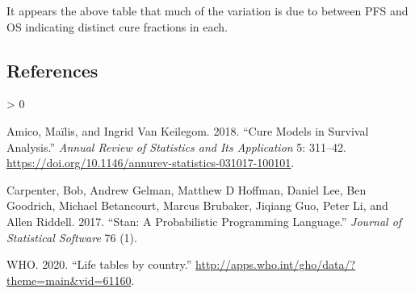 \documentclass[
]{article}
\newlength{\cslhangindent}
\newenvironment{CSLReferences}[2] %
 {%
  \setlength{\parindent}{0pt}
  \ifodd #1 \everypar{\setlength{\hangindent}{\cslhangindent}}\ignorespaces\fi
  \ifnum #2 > 0
  \setlength{\parskip}{#2\baselineskip}
  \fi
 }%
 {}
\begin{document}
It appears the above table that much of the variation is due to between
PFS and OS indicating distinct cure fractions in each.

\hypertarget{references}{%
\subsection*{References}\label{references}}

\hypertarget{refs}{}
\begin{CSLReferences}{1}{0}
\leavevmode\hypertarget{ref-Amico2018}{}%
Amico, Maïlis, and Ingrid Van Keilegom. 2018. {``{Cure Models in
Survival Analysis}.''} \emph{Annual Review of Statistics and Its
Application} 5: 311--42.
\url{https://doi.org/10.1146/annurev-statistics-031017-100101}.

\leavevmode\hypertarget{ref-carpenter2017stan}{}%
Carpenter, Bob, Andrew Gelman, Matthew D Hoffman, Daniel Lee, Ben
Goodrich, Michael Betancourt, Marcus Brubaker, Jiqiang Guo, Peter Li,
and Allen Riddell. 2017. {``Stan: A Probabilistic Programming
Language.''} \emph{Journal of Statistical Software} 76 (1).

\leavevmode\hypertarget{ref-wholifetables}{}%
WHO. 2020. {``{Life tables by country}.''}
\url{http://apps.who.int/gho/data/?theme=main\&vid=61160}.

\end{CSLReferences}
\end{document}
